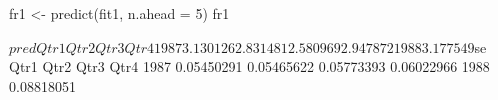 \begin{Schunk}
\begin{Sinput}
 fr1 <- predict(fit1, n.ahead = 5)
 fr1
\end{Sinput}
\begin{Soutput}
$pred
         Qtr1     Qtr2     Qtr3     Qtr4
1987 3.130126 2.831481 2.580969 2.947872
1988 3.177549                           

$se
           Qtr1       Qtr2       Qtr3       Qtr4
1987 0.05450291 0.05465622 0.05773393 0.06022966
1988 0.08818051                                 
\end{Soutput}
\end{Schunk}
